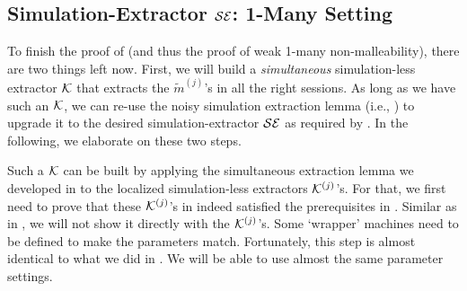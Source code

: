 



\subsection{Simulation-Extractor $\mathcal{SE}$: 1-Many Setting}
\label{sec:sim-ext:1-many:final}

To finish the proof of  (and thus the proof of weak 1-many non-malleability), there are two things left now. First, we will build a {\em simultaneous} simulation-less extractor $\mathcal{K}$ that extracts the $\tilde{m}^{(j)}$'s in all the right sessions. As long as we have such an $\mathcal{K}$, we can re-use the noisy simulation extraction lemma (i.e., ) to upgrade it to the desired simulation-extractor $\mathcal{SE}$ as required by . In the following, we elaborate on these two steps.

 Such a $\mathcal{K}$ can be built by applying the simultaneous extraction lemma we developed in  to the localized simulation-less extractors $\mathcal{K}^{(j)}$'s. For that, we first need to prove that these $\mathcal{K}^{(j)}$'s in  indeed satisfied the prerequisites in . Similar as in , we will not show it directly with the $\mathcal{K}^{(j)}$'s. Some `wrapper' machines need to be defined to make the parameters match. Fortunately, this step is almost identical to what we did in . We will be able to use almost the same parameter settings.  

